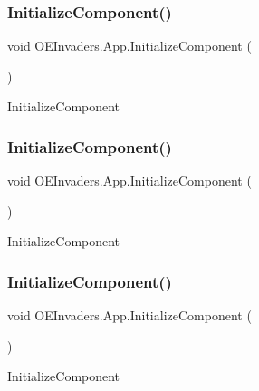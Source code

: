 \subsubsection{\texorpdfstring{InitializeComponent()}{InitializeComponent()}\hspace{0.1cm}{\footnotesize\ttfamily [1/4]}}
{\footnotesize\ttfamily void O\+E\+Invaders.\+App.\+Initialize\+Component (\begin{DoxyParamCaption}{ }\end{DoxyParamCaption})}



Initialize\+Component 

\mbox{\label{class_o_e_invaders_1_1_app_abca070a66419a1a060848b03639635b3}} 
\subsubsection{\texorpdfstring{InitializeComponent()}{InitializeComponent()}\hspace{0.1cm}{\footnotesize\ttfamily [2/4]}}
{\footnotesize\ttfamily void O\+E\+Invaders.\+App.\+Initialize\+Component (\begin{DoxyParamCaption}{ }\end{DoxyParamCaption})}



Initialize\+Component 

\mbox{\label{class_o_e_invaders_1_1_app_abca070a66419a1a060848b03639635b3}} 
\subsubsection{\texorpdfstring{InitializeComponent()}{InitializeComponent()}\hspace{0.1cm}{\footnotesize\ttfamily [3/4]}}
{\footnotesize\ttfamily void O\+E\+Invaders.\+App.\+Initialize\+Component (\begin{DoxyParamCaption}{ }\end{DoxyParamCaption})}



Initialize\+Component 

